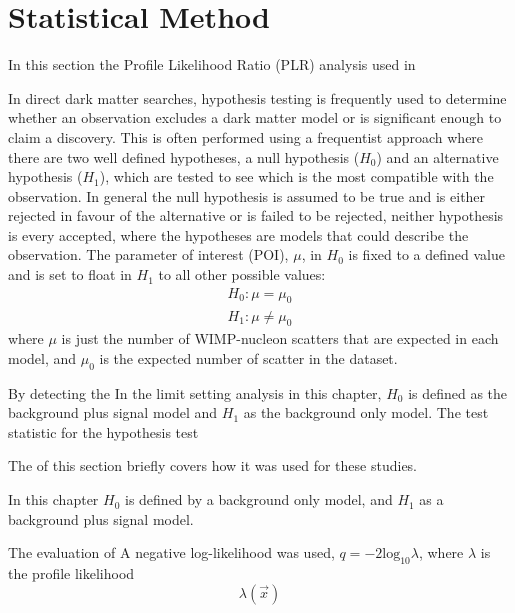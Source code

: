 \section{Statistical Method}
\par
In this section the Profile Likelihood Ratio (PLR) analysis used in 

\par
In direct dark matter searches, hypothesis testing is frequently used to determine whether an observation excludes a dark matter model or is significant enough to claim a discovery.
This is often performed using a frequentist approach where there are two well defined hypotheses, a null hypothesis ($H_0$) and an alternative hypothesis ($H_1$), which are tested to see which is the most compatible with the observation.
In general the null hypothesis is assumed to be true and is either rejected in favour of the alternative or is failed to be rejected, neither hypothesis is every accepted, where the hypotheses are models that could describe the observation.
The parameter of interest (POI), $\mu$, in $H_0$ is fixed to a defined value and is set to float in $H_1$ to all other possible values:
\begin{equation}
    \begin{split}
        H_0: \mu = \mu_0 \\
        H_1: \mu \neq \mu_0
    \end{split}
\end{equation}
where $\mu$ is just the number of WIMP-nucleon scatters that are expected in each model, and $\mu_0$ is the expected number of scatter in the dataset.

\par
By detecting the 
In the limit setting analysis in this chapter, $H_0$ is defined as the background plus signal model and $H_1$ as the background only model.
The test statistic for the hypothesis test


The of this section briefly covers how it was used for these studies.

In this chapter $H_0$ is defined by a background only model, and $H_1$ as a background plus signal model.
\par
The evaluation of 
A negative log-likelihood was used, $q = -2 \text{log}_{10}\lambda$, where $\lambda$ is the profile likelihood
\begin{equation}
    \lambda(\vec{x}) %
\end{equation}


